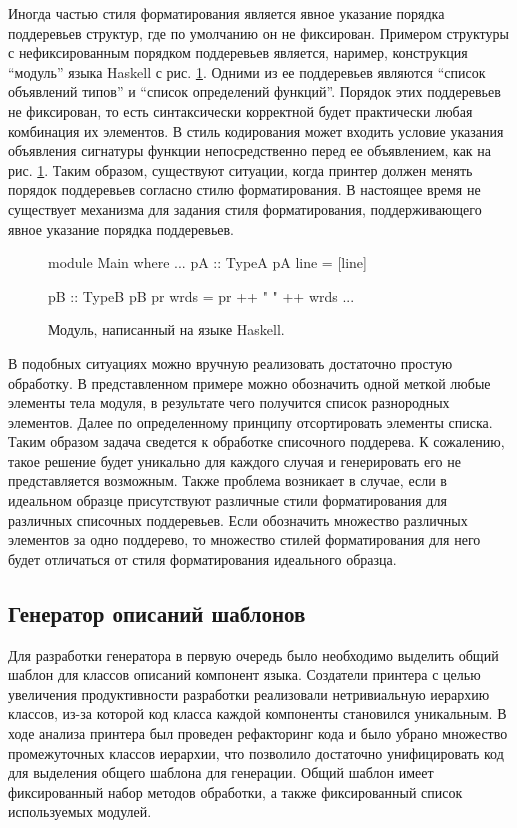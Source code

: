 \documentclass{matmex-diploma}
\begin{document}
Иногда частью стиля форматирования является явное указание порядка поддеревьев структур, где по умолчанию он не фиксирован. Примером структуры с нефиксированным порядком поддеревьев является, наример, конструкция “модуль” языка Haskell с рис. \ref{haskellModule}. Одними из ее поддеревьев являются “список объявлений типов” и “список определений функций”. Порядок этих поддеревьев не фиксирован, то есть синтаксически корректной будет практически любая комбинация их элементов. В стиль кодирования может входить условие указания объявления сигнатуры функции непосредственно перед ее объявлением, как на рис. \ref{haskellModule}. Таким образом, существуют ситуации, когда принтер должен менять порядок поддеревьев согласно стилю форматирования. В настоящее время не существует механизма для задания стиля форматирования, поддерживающего явное указание порядка поддеревьев.  

\begin{figure}[H]
    \begin{pyglist}[language=haskell,numbers=left,numbersep=5pt]
    module Main where
    ...
    pA :: TypeA
    pA line = [line]
    
    pB :: TypeB
    pB pr wrds = pr ++ " " ++ wrds
    ...
    \end{pyglist}
\caption{Модуль, написанный на языке Haskell.}    
\label{haskellModule}
\end{figure}


В подобных ситуациях можно вручную реализовать достаточно простую обработку. В представленном примере можно обозначить одной меткой любые элементы тела модуля, в результате чего получится список разнородных элементов. Далее по определенному принципу отсортировать элементы списка. Таким образом задача сведется к обработке списочного поддерева. К сожалению, такое решение будет уникально для каждого случая и генерировать его не представляется возможным. Также проблема возникает в случае, если в идеальном образце присутствуют различные стили форматирования для различных списочных поддеревьев. Если обозначить множество различных элементов за одно поддерево, то множество стилей форматирования для него будет отличаться от стиля форматирования идеального образца.

\subsection{Генератор описаний шаблонов}

Для разработки генератора в первую очередь было необходимо выделить общий шаблон для классов описаний компонент языка. Создатели принтера \cite{podkopaev:diploma} с целью увеличения продуктивности разработки реализовали нетривиальную иерархию классов, из-за которой код класса каждой компоненты становился уникальным. В ходе анализа принтера был проведен рефакторинг кода и было убрано множество промежуточных классов иерархии, что позволило достаточно унифицировать код для выделения общего шаблона для генерации. Общий шаблон имеет фиксированный набор методов обработки, а также фиксированный список используемых модулей.
\end{document}

